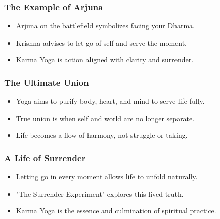 \begin{frame}[fragile]\frametitle{The Example of Arjuna}
  \begin{itemize}
    \item Arjuna on the battlefield symbolizes facing your Dharma.
    \item Krishna advises to let go of self and serve the moment.
    \item Karma Yoga is action aligned with clarity and surrender.
  \end{itemize}
\end{frame}

\begin{frame}[fragile]\frametitle{The Ultimate Union}
  \begin{itemize}
    \item Yoga aims to purify body, heart, and mind to serve life fully.
    \item True union is when self and world are no longer separate.
    \item Life becomes a flow of harmony, not struggle or taking.
  \end{itemize}
\end{frame}

\begin{frame}[fragile]\frametitle{A Life of Surrender}
  \begin{itemize}
    \item Letting go in every moment allows life to unfold naturally.
    \item "The Surrender Experiment" explores this lived truth.
    \item Karma Yoga is the essence and culmination of spiritual practice.
  \end{itemize}
\end{frame}
